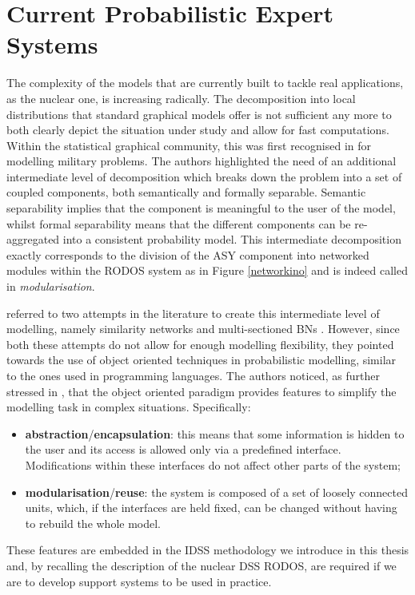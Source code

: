 \section{Current Probabilistic Expert Systems}
\label{sec:current}
The complexity of the models that are currently built to tackle real applications, as the nuclear one, is increasing radically. The decomposition into local distributions that standard graphical models offer is not sufficient any more to both clearly depict the situation under study and allow for fast computations. Within the statistical graphical community, this was first recognised in \citet{Mahoney1996} for modelling military problems. The authors highlighted the need of an additional intermediate level of decomposition which breaks down the problem into a set of coupled components, both semantically and formally separable. Semantic separability implies that the component is meaningful to the user of the model, whilst formal separability means that the different components can be re-aggregated into a consistent probability model. This intermediate decomposition exactly corresponds to the division of the ASY component into networked modules within the RODOS system as in Figure \ref{networkino} and is indeed called in \citet{Mahoney1996} \textit{modularisation}.

\citet{Mahoney1996} referred to two attempts in the literature to create this intermediate level of modelling, namely similarity networks \citep{Heckerman1990} and  multi-sectioned BNs \citep{Xiang2002,Xiang2011}.  However, since both these attempts do not allow for enough modelling flexibility, they pointed towards the use of object oriented techniques in probabilistic modelling, similar to the ones used in programming languages. The authors noticed, as further stressed in \citet{Johnson2012}, that the object oriented paradigm provides features to simplify the modelling task in complex situations.  Specifically:
\begin{itemize}
\item \textbf{abstraction}/\textbf{encapsulation}: this means that some information is hidden to the user and its access is allowed only via a predefined interface. Modifications within these interfaces do not affect other parts of the system;
\item \textbf{modularisation}/\textbf{reuse}: the system is composed of a set of loosely connected units, which, if the interfaces are held fixed, can be changed without having to rebuild the whole model.
\end{itemize} 
These features are embedded in the IDSS methodology we introduce in this thesis and, by recalling the description of the nuclear DSS RODOS, are required if we are to develop support systems to be used in practice. 

